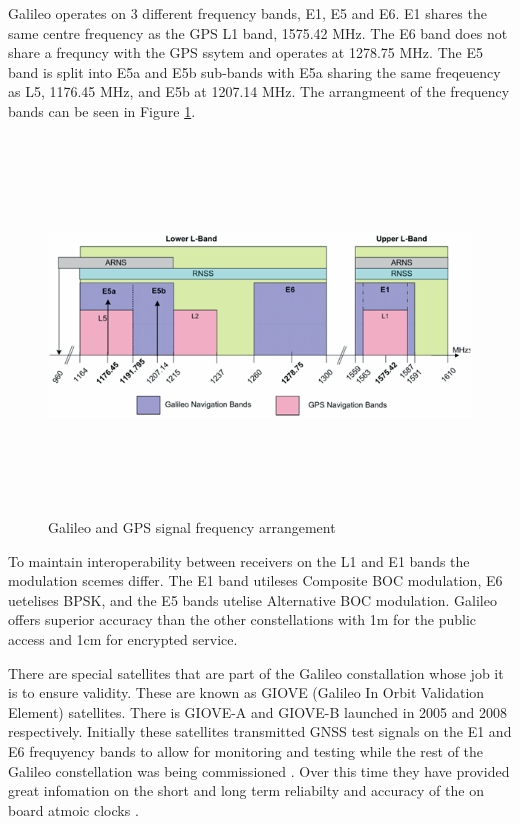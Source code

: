 Galileo operates on 3 different frequency bands, E1, E5 and E6. E1 shares the same centre frequency as the GPS L1 band, 1575.42 MHz. The E6 band does not share a frequncy
with the GPS ssytem and operates at 1278.75 MHz. The E5 band is split into E5a and E5b sub-bands with E5a sharing the same freqeuency as L5, 1176.45 MHz, and E5b at
1207.14 MHz. The arrangmeent of the frequency bands can be seen in Figure \ref{fig:SignalPlan}.

\begin{figure}[h]
    \begin{centering}
        \includegraphics[width=14cm,height=10cm,keepaspectratio]{Figures/Galileo_Frequency_Plan.png}
        \caption{Galileo and GPS signal frequency arrangement}
        \label{fig:SignalPlan}
    \end{centering}
\end{figure}

To maintain interoperability between receivers on the L1 and E1 bands the modulation scemes differ.
The E1 band utileses Composite BOC modulation, E6 uetelises BPSK, and the E5 bands utelise Alternative BOC modulation.
Galileo offers superior accuracy than the other constellations with 1m for the public access and 1cm for encrypted service.

There are special satellites that are part of the Galileo constallation whose job it is to ensure validity. These are known as GIOVE (Galileo In Orbit Validation Element)
satellites. There is GIOVE-A and GIOVE-B launched in 2005 and 2008 respectively. Initially these satellites transmitted GNSS test signals on the E1 and E6 frequyency
bands to allow for monitoring and testing while the rest of the Galileo constellation was being commissioned \cite{RN65}. Over this time they have provided great infomation on the
short and long term reliabilty and accuracy of the on board atmoic clocks \cite{RN66}.

